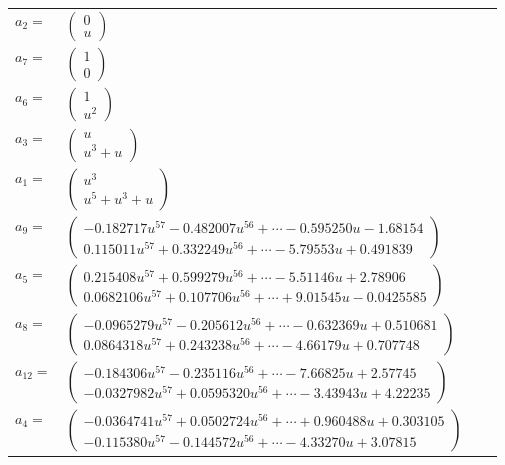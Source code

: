 \documentclass[1p]{elsarticle_modified}
\theoremstyle{definition}
\begin{document}
\begin{tabular}{m{7pt} m{180pt} m{7pt} m{180pt} }
\flushright $a_{2}=$&$\begin{pmatrix}0\\u\end{pmatrix}$ \\
\flushright $a_{7}=$&$\begin{pmatrix}1\\0\end{pmatrix}$ \\
\flushright $a_{6}=$&$\begin{pmatrix}1\\u^2\end{pmatrix}$ \\
\flushright $a_{3}=$&$\begin{pmatrix}u\\u^3+u\end{pmatrix}$ \\
\flushright $a_{1}=$&$\begin{pmatrix}u^3\\u^5+u^3+u\end{pmatrix}$ \\
\flushright $a_{9}=$&$\begin{pmatrix}-0.182717 u^{57}-0.482007 u^{56}+\cdots-0.595250 u-1.68154\\0.115011 u^{57}+0.332249 u^{56}+\cdots-5.79553 u+0.491839\end{pmatrix}$ \\
\flushright $a_{5}=$&$\begin{pmatrix}0.215408 u^{57}+0.599279 u^{56}+\cdots-5.51146 u+2.78906\\0.0682106 u^{57}+0.107706 u^{56}+\cdots+9.01545 u-0.0425585\end{pmatrix}$ \\
\flushright $a_{8}=$&$\begin{pmatrix}-0.0965279 u^{57}-0.205612 u^{56}+\cdots-0.632369 u+0.510681\\0.0864318 u^{57}+0.243238 u^{56}+\cdots-4.66179 u+0.707748\end{pmatrix}$ \\
\flushright $a_{12}=$&$\begin{pmatrix}-0.184306 u^{57}-0.235116 u^{56}+\cdots-7.66825 u+2.57745\\-0.0327982 u^{57}+0.0595320 u^{56}+\cdots-3.43943 u+4.22235\end{pmatrix}$ \\
\flushright $a_{4}=$&$\begin{pmatrix}-0.0364741 u^{57}+0.0502724 u^{56}+\cdots+0.960488 u+0.303105\\-0.115380 u^{57}-0.144572 u^{56}+\cdots-4.33270 u+3.07815\end{pmatrix}$ \\

\end{tabular}
\end{document}
